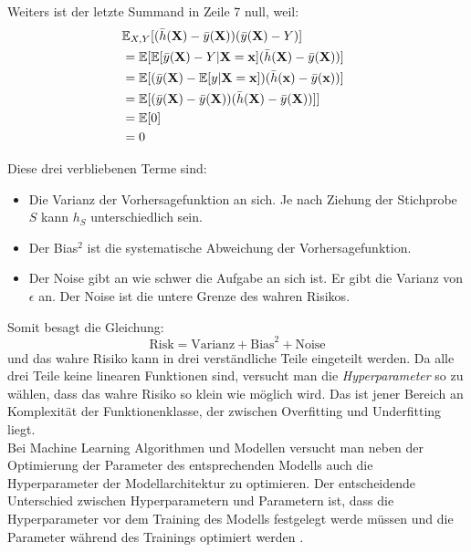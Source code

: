 Weiters ist der letzte Summand in Zeile 7 null, weil:
\begin{equation*}
  \begin{split}
    \lefteqn{ \mathbb{E}_{X, Y}[(\bar{h}(\mathbf{X})-\bar{y}(\mathbf{X}))(\bar{y}(\mathbf{X})-Y)] } \\\
    & = \mathbb{E}[\mathbb{E}[\bar{y}(\mathbf{X})-Y|\mathbf{X} = \mathbf{x}](\bar{h}(\mathbf{X})-\bar{y}(\mathbf{X}))] \\\
    & = \mathbb{E}[(\bar{y}(\mathbf{X})-\mathbb{E}[y|\mathbf{X} = \mathbf{x}])(\bar{h}(\mathbf{x})-\bar{y}(\mathbf{x}))] \\\
    & = \mathbb{E}[(\bar{y}(\mathbf{X})-\bar{y}(\mathbf{X}))(\bar{h}(\mathbf{X})-\bar{y}(\mathbf{X}))]] \\\
    & = \mathbb{E}[0]\\\
    & = 0
  \end{split}
\end{equation*}


Diese drei verbliebenen Terme sind:
\begin{itemize}
  \item Die Varianz der Vorhersagefunktion an sich. Je nach Ziehung der Stichprobe $S$ kann $h_S$ unterschiedlich sein.
  \item Der Bias$^2$ ist die systematische Abweichung der Vorhersagefunktion. %
  \item Der Noise gibt an wie schwer die Aufgabe an sich ist. Er gibt die Varianz von $\epsilon$ an. Der Noise ist die untere Grenze des wahren Risikos.
\end{itemize}

Somit besagt die Gleichung:
$$ \text{Risk} = \text{Varianz} + \text{Bias}^2 + \text{Noise} $$
und das wahre Risiko kann in drei verst\"andliche Teile eingeteilt werden. Da alle drei Teile keine linearen Funktionen sind, 
versucht man die \textit{Hyperparameter} so zu w\"ahlen, dass das wahre Risiko so klein wie 
m\"oglich wird. Das ist jener Bereich an Komplexit\"at der Funktionenklasse, der zwischen Overfitting und Underfitting liegt. \\


Bei Machine Learning Algorithmen und Modellen versucht man neben der Optimierung der Parameter des entsprechenden Modells 
auch die Hyperparameter der Modellarchitektur zu optimieren. Der entscheidende Unterschied zwischen Hyperparametern
und Parametern ist, dass die Hyperparameter vor dem Training des Modells festgelegt werde m\"ussen und die Parameter w\"ahrend des Trainings
optimiert werden \cite{hyper}. \\

